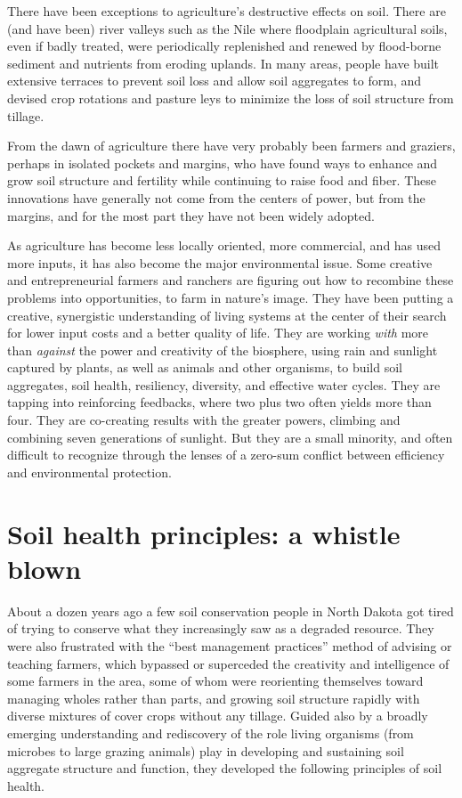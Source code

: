 \documentclass[11pt,letterpaper,twoside,onecolumn]{memoir}
\begin{document}
There have been exceptions to agriculture's destructive effects on soil. There are (and have been) river valleys such as the Nile where floodplain agricultural soils, even if badly treated, were periodically replenished and renewed by flood-borne sediment and nutrients from eroding uplands. In many areas, people have built extensive terraces to prevent soil loss and allow soil aggregates to form, and devised crop rotations and pasture leys to minimize the loss of soil structure from tillage. 

From the dawn of agriculture there have very probably been farmers and graziers, perhaps in isolated pockets and margins, who have found ways to enhance and grow soil structure and fertility while continuing to raise food and fiber. These innovations have generally not come from the centers of power, but from the margins, and for the most part they have not been widely adopted.

As agriculture has become less locally oriented, more commercial, and has used more inputs, it has also become the major environmental issue. Some creative and entrepreneurial farmers and ranchers are figuring out how to recombine these problems into opportunities, to farm in nature's image. They have been putting a creative, synergistic understanding of living systems at the center of their search for lower input costs and a better quality of life. They are working \textit{with} more than \textit{against} the power and creativity of the biosphere, using rain and sunlight captured by plants, as well as animals and other organisms, to build soil aggregates, soil health, resiliency, diversity, and effective water cycles. They are tapping into reinforcing feedbacks, where two plus two often yields more than four. They are co-creating results with the greater powers, climbing and combining seven generations of sunlight. But they are a small minority, and often difficult to recognize through the lenses of a zero-sum conflict between efficiency and environmental protection.

\section*{Soil health principles: a whistle blown}

About a dozen years ago a few soil conservation people in North Dakota got tired of trying to conserve what they increasingly saw as a degraded resource. They were also frustrated with the ``best management practices'' method of advising or teaching farmers, which bypassed or superceded the creativity and intelligence of some farmers in the area, some of whom were reorienting themselves toward managing wholes rather than parts, and growing soil structure rapidly with diverse mixtures of cover crops without any tillage. Guided also by a broadly emerging understanding and rediscovery of the role living organisms (from microbes to large grazing animals) play in developing and sustaining soil aggregate structure and function, they developed the following principles of soil health.
\end{document}
